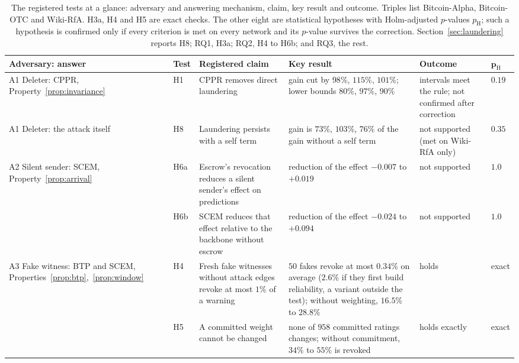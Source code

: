 \documentclass[lettersize,journal]{IEEEtran}
\begin{document}
\begin{table}[!t]
\caption{The registered tests at a glance: adversary and answering mechanism, claim, key result and outcome. Triples list Bitcoin-Alpha, Bitcoin-OTC and Wiki-RfA. H3a, H4 and H5 are exact checks. The other eight are statistical hypotheses with Holm-adjusted $p$-values $p_{\mathrm{H}}$; such a hypothesis is confirmed only if every criterion is met on every network and its $p$-value survives the correction. Section~\ref{sec:laundering} reports H8; RQ1, H3a; RQ2, H4 to H6b; and RQ3, the rest.}
\label{tab:hypotheses}
\centering
\footnotesize
\setlength{\tabcolsep}{4pt}
\begin{tabular}{@{}>{\raggedright\arraybackslash}p{}l>{\raggedright\arraybackslash}p{}>{\raggedright\arraybackslash}p{}>{\raggedright\arraybackslash}p{}l@{}}
\toprule
\textbf{Adversary: answer} & \textbf{Test} & \textbf{Registered claim} & \textbf{Key result} & \textbf{Outcome} & $\boldsymbol{p_{\mathrm{H}}}$ \\
\midrule
A1 Deleter: CPPR, Property~\ref{prop:invariance} & H1 & CPPR removes direct laundering & gain cut by $98\%$, $115\%$, $101\%$; lower bounds $80\%$, $97\%$, $90\%$ & intervals meet the rule; not confirmed after correction & $0.19$ \\
A1 Deleter: the attack itself & H8 & Laundering persists with a self term & gain is $73\%$, $103\%$, $76\%$ of the gain without a self term & not supported (met on Wiki-RfA only) & $0.35$ \\
\addlinespace[2pt]
A2 Silent sender: SCEM, Property~\ref{prop:arrival} & H6a & Escrow's revocation reduces a silent sender's effect on predictions & reduction of the effect $-0.007$ to $+0.019$ & not supported & $1.0$ \\
 & H6b & SCEM reduces that effect relative to the backbone without escrow & reduction of the effect $-0.024$ to $+0.094$ & not supported & $1.0$ \\
\addlinespace[2pt]
A3 Fake witness: BTP and SCEM, Properties~\ref{prop:btp},~\ref{prop:window} & H4 & Fresh fake witnesses without attack edges revoke at most $1\%$ of a warning & $50$ fakes revoke at most $0.34\%$ on average ($2.6\%$ if they first build reliability, a variant outside the test); without weighting, $16.5\%$ to $28.8\%$ & holds & exact \\
 & H5 & A committed weight cannot be changed & none of $958$ committed ratings changes; without commitment, $34\%$ to $55\%$ is revoked & holds exactly & exact \\

\end{tabular}
\end{table}
\end{document}
